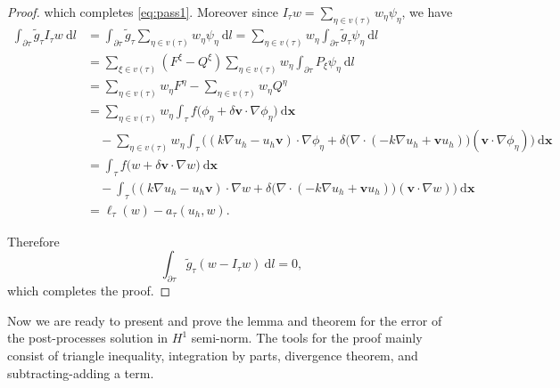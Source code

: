 \documentclass[times]{nlaauth}
\numberwithin{equation}{section}
\begin{document}
\begin{proof}
\noindent
which completes \eqref{eq:pass1}. Moreover since $I_\tau w = \displaystyle \sum_{\eta \in v(\tau)} w_\eta \psi_\eta$, we have
\begin{equation*}
\begin{aligned}
\int_{\partial \tau} \widetilde g_\tau I_\tau w \ \text{d} l & = \int_{\partial \tau} \widetilde g_\tau \sum_{\eta \in v(\tau)} w_\eta \psi_\eta  \ \text{d} l
= \sum_{\eta \in v(\tau)} w_\eta  \int_{\partial \tau} \widetilde g_\tau \psi_\eta \ \text{d} l  \\
& = \sum_{\xi \in v(\tau)} ( F^\xi - Q^\xi )  \sum_{\eta \in v(\tau)} w_\eta  \int_{\partial \tau} P_\xi  \psi_\eta \ \text{d} l  \\
& = \sum_{\eta \in v(\tau)} w_\eta F^\eta - \sum_{\eta \in v(\tau)} w_\eta Q^\eta \\
& = \sum_{\eta \in v(\tau)} w_\eta  \int_\tau f \big(\phi_\eta + \delta \boldsymbol{v}  \cdot \nabla \phi_\eta \big) \ \text{d} \boldsymbol{x}  \\
& \quad - \sum_{\eta \in v(\tau)} w_\eta \int_\tau  \Big( (k \nabla u_h - u_h \boldsymbol{v}) \cdot \nabla \phi_\eta + \delta  \big(  \nabla \cdot ( -k\nabla u_h + \boldsymbol{v} u_h ) \big)  ( \boldsymbol{v}  \cdot \nabla \phi_\eta) \Big) \ \text{d} \boldsymbol{x}  \\
& = \int_\tau f \big(w + \delta \boldsymbol{v}  \cdot \nabla w \big) \ \text{d} \boldsymbol{x} \\
& \quad - \int_\tau \Big( ( k \nabla u_h - u_h \boldsymbol{v} ) \cdot \nabla w + \delta  \big(  \nabla \cdot ( -k\nabla u_h + \boldsymbol{v} u_h ) \big)  ( \boldsymbol{v}  \cdot \nabla w) \Big) \ \text{d} \boldsymbol{x} \\
& = \ell_\tau (w) - a_\tau(u_h, w).
\end{aligned}
\end{equation*}

\noindent
Therefore
$$
\int_{\partial \tau} \widetilde g_\tau( w - I_\tau w)  \ \text{d} l = 0,
$$
which completes the proof.
\end{proof}

Now we are ready to present and prove the lemma and theorem for the error
of the post-processes solution in $H^1$ semi-norm. The tools for the proof mainly consist of triangle inequality, integration by parts, divergence theorem, and subtracting-adding a term.
\end{document}
